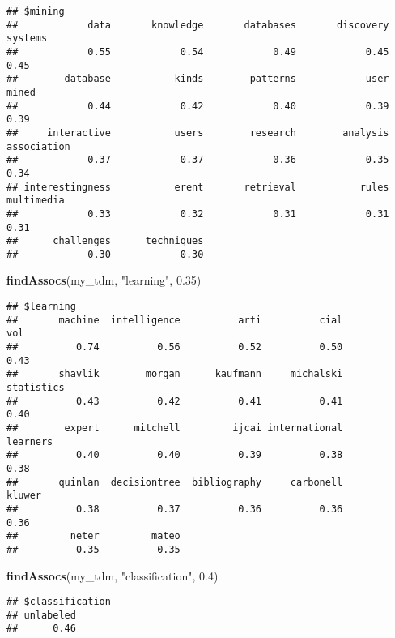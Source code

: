 \documentclass[
]{article}
\newenvironment{Shaded}{\begin{snugshade}}{\end{snugshade}}
\newcommand{\FloatTok}[1]{\textcolor[rgb]{0.00,0.00,0.81}{#1}}
\newcommand{\FunctionTok}[1]{\textcolor[rgb]{0.13,0.29,0.53}{\textbf{#1}}}
\newcommand{\NormalTok}[1]{#1}
\newcommand{\StringTok}[1]{\textcolor[rgb]{0.31,0.60,0.02}{#1}}
\begin{document}
\begin{verbatim}
## $mining
##            data       knowledge       databases       discovery         systems 
##            0.55            0.54            0.49            0.45            0.45 
##        database           kinds        patterns            user           mined 
##            0.44            0.42            0.40            0.39            0.39 
##     interactive           users        research        analysis     association 
##            0.37            0.37            0.36            0.35            0.34 
## interestingness           erent       retrieval           rules      multimedia 
##            0.33            0.32            0.31            0.31            0.31 
##      challenges      techniques 
##            0.30            0.30
\end{verbatim}

\begin{Shaded}
\begin{Highlighting}[]
\FunctionTok{findAssocs}\NormalTok{(my\_tdm, }\StringTok{"learning"}\NormalTok{, }\FloatTok{0.35}\NormalTok{)}
\end{Highlighting}
\end{Shaded}

\begin{verbatim}
## $learning
##       machine  intelligence          arti          cial           vol 
##          0.74          0.56          0.52          0.50          0.43 
##       shavlik        morgan      kaufmann     michalski    statistics 
##          0.43          0.42          0.41          0.41          0.40 
##        expert      mitchell         ijcai international      learners 
##          0.40          0.40          0.39          0.38          0.38 
##       quinlan  decisiontree  bibliography     carbonell        kluwer 
##          0.38          0.37          0.36          0.36          0.36 
##         neter         mateo 
##          0.35          0.35
\end{verbatim}

\begin{Shaded}
\begin{Highlighting}[]
\FunctionTok{findAssocs}\NormalTok{(my\_tdm, }\StringTok{"classification"}\NormalTok{, }\FloatTok{0.4}\NormalTok{)}
\end{Highlighting}
\end{Shaded}

\begin{verbatim}
## $classification
## unlabeled 
##      0.46
\end{verbatim}
\end{document}
